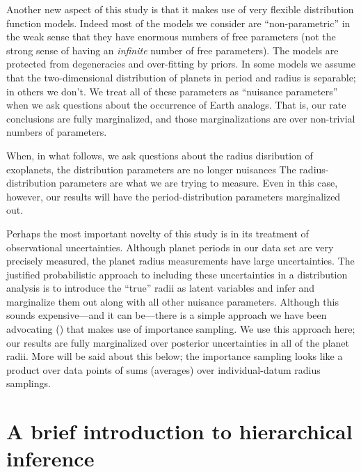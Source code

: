 \documentclass[12pt,preprint]{aastex}
\begin{document}
Another new aspect of this study is that it makes use of very flexible
distribution function models.
Indeed most of the models we consider are ``non-parametric'' in the weak sense
that they have enormous numbers of free parameters (not the strong sense of
having an \emph{infinite} number of free parameters).
The models are protected from degeneracies and over-fitting by priors.
In some models we assume that the two-dimensional distribution of planets in
period and radius is separable; in others we don't.
We treat all of these parameters as ``nuisance parameters'' when we ask
questions about the occurrence of Earth analogs.
That is, our rate conclusions are fully marginalized, and those
marginalizations are over non-trivial numbers of parameters.

When, in what follows, we ask questions about the radius disribution of
exoplanets, the distribution parameters are no longer nuisances The
radius-distribution parameters are what we are trying to measure.
Even in this case, however, our results will have the period-distribution
parameters marginalized out.

Perhaps the most important novelty of this study is in its treatment of
observational uncertainties.
Although planet periods in our data set are very precisely measured, the
planet radius measurements have large uncertainties.
The justified probabilistic approach to including these uncertainties in a
distribution analysis is to introduce the ``true'' radii as latent variables
and infer and marginalize them out along with all other nuisance parameters.
Although this sounds expensive---and it can be---there is a simple approach
we have been advocating (\cite{hogge}) that makes use of importance sampling.
We use this approach here; our results are fully marginalized over posterior
uncertainties in all of the planet radii.
More will be said about this below; the importance sampling looks like a
product over data points of sums (averages) over individual-datum radius
samplings.

\section{A brief introduction to hierarchical inference}
\end{document}
